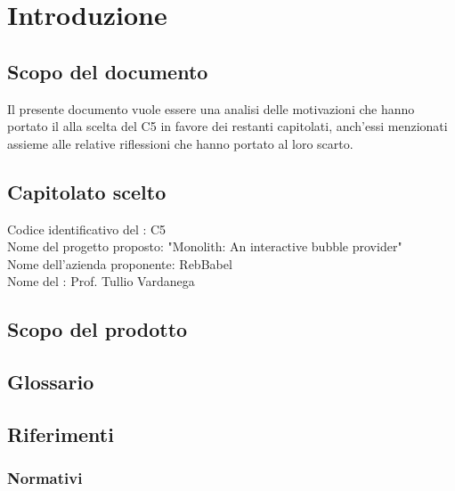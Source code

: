 \section{Introduzione}
\subsection{Scopo del documento}
Il presente documento vuole essere una analisi delle motivazioni che hanno portato il  alla scelta del  C5 in favore dei restanti capitolati, anch'essi menzionati assieme alle relative riflessioni che hanno portato al loro scarto.

\subsection{Capitolato scelto}
Codice identificativo del : C5 \\
Nome del progetto proposto: "Monolith: An interactive bubble provider" \\
Nome dell'azienda proponente: RebBabel \\
Nome del : Prof. Tullio Vardanega

\subsection{Scopo del prodotto}
\scopoProdotto

\subsection{Glossario}
\descrizioneGlossario

\subsection{Riferimenti}
\subsubsection{Normativi}
\riferimentiNormativi

